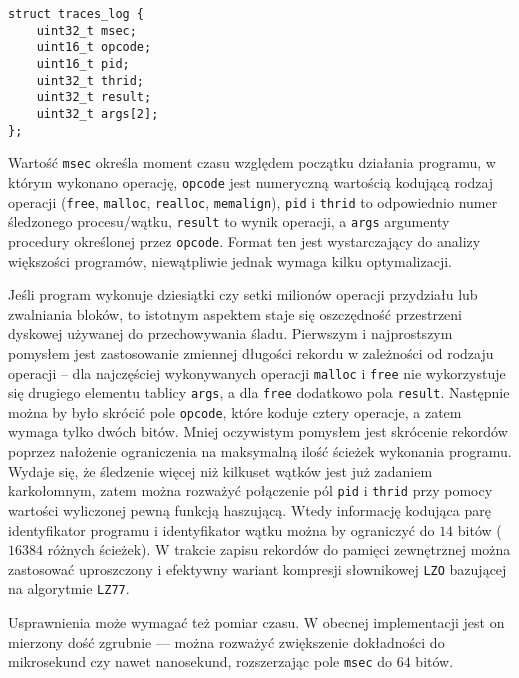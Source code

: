 \documentclass[12pt,a4paper,titlepage,twoside]{mwart}
\begin{document}
\vspace{1ex}

\begin{lstlisting}[caption={Struktura śladu.}]
struct traces_log {
    uint32_t msec;
    uint16_t opcode;
    uint16_t pid;
    uint32_t thrid;
    uint32_t result;
    uint32_t args[2];
};
\end{lstlisting}

\vspace{-1ex}

Wartość \texttt{msec} określa moment czasu względem początku działania
programu, w którym wykonano operację, \texttt{opcode} jest numeryczną wartością
kodującą rodzaj operacji (\texttt{free}, \texttt{malloc}, \texttt{realloc},
\texttt{memalign}), \texttt{pid} i \texttt{thrid} to odpowiednio numer
śledzonego procesu/wątku, \texttt{result} to wynik operacji, a \texttt{args}
argumenty procedury określonej przez \texttt{opcode}. Format ten jest
wystarczający do analizy większości programów, niewątpliwie jednak wymaga kilku
optymalizacji.

Jeśli program wykonuje dziesiątki czy setki milionów operacji przydziału lub
zwalniania bloków, to istotnym aspektem staje się oszczędność przestrzeni
dyskowej używanej do przechowywania śladu. Pierwszym i najprostszym pomysłem
jest zastosowanie zmiennej długości rekordu w zależności od rodzaju operacji --
dla najczęściej wykonywanych operacji \texttt{malloc} i \texttt{free} nie
wykorzystuje się drugiego elementu tablicy \texttt{args}, a dla \texttt{free}
dodatkowo pola \texttt{result}. Następnie można by było skrócić pole
\texttt{opcode}, które koduje cztery operacje, a zatem wymaga tylko dwóch
bitów. Mniej oczywistym pomysłem jest skrócenie rekordów poprzez nałożenie
ograniczenia na maksymalną ilość ścieżek wykonania programu. Wydaje się, że
śledzenie więcej niż kilkuset wątków jest już zadaniem karkołomnym, zatem można
rozważyć połączenie pól \texttt{pid} i \texttt{thrid} przy pomocy wartości
wyliczonej pewną funkcją haszującą. Wtedy informację kodująca parę
identyfikator programu i identyfikator wątku można by ograniczyć do $14$ bitów
($16384$ różnych ścieżek). W trakcie zapisu rekordów do pamięci zewnętrznej
można zastosować uproszczony i efektywny wariant kompresji słownikowej
\texttt{LZO} bazującej na algorytmie \texttt{LZ77}.

Usprawnienia może wymagać też pomiar czasu. W obecnej implementacji jest on
mierzony dość zgrubnie ---  można rozważyć zwiększenie dokładności do
mikrosekund czy nawet nanosekund, rozszerzając pole \texttt{msec} do $64$
bitów.
\end{document}
